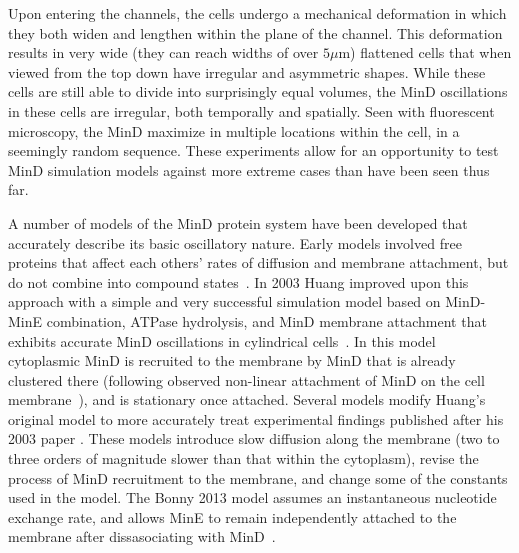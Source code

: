 \documentclass[letterpaper,twocolumn,amsmath,amssymb,pre]{revtex4-1}
\newcommand\micron{\ensuremath{\mu\text{m}}}
\begin{document}
Upon entering the channels, the cells undergo a mechanical deformation
in which they both widen and lengthen within the plane of the channel.
This deformation results in very wide (they can reach widths of over
$5\micron$) flattened cells that when viewed from the top down have
irregular and asymmetric shapes.  While these cells are still able to
divide into surprisingly equal volumes, the MinD oscillations in these
cells are irregular, both temporally and spatially. Seen with
fluorescent microscopy, the MinD maximize in multiple locations within
the cell, in a seemingly random sequence. These experiments allow for
an opportunity to test MinD simulation models against more extreme
cases than have been seen thus far.

A number of models of the MinD protein system have been developed that
accurately describe its basic oscillatory nature.
%
Early models involved free proteins that affect each others' rates of
diffusion and membrane attachment, but do not combine into compound
states~\cite{meinhardt2001pattern}.  In 2003 Huang improved upon this
approach with a simple and very successful simulation model based on
MinD-MinE combination, ATPase hydrolysis, and MinD membrane attachment
that exhibits accurate MinD oscillations in cylindrical
cells~\cite{huang2003dynamic}. In this model cytoplasmic MinD is
recruited to the membrane by MinD that is already clustered there
(following observed non-linear attachment of MinD on the cell
membrane~\cite{hu2002dynamic,shih2002division}), and is stationary
once attached.
%
Several models
\cite{fange2006noise,bonny2013membrane,halatek2012highly} modify
Huang's original model to more accurately treat experimental findings
published after his 2003 paper
\cite{meacci2006mobility,loose2011min}. These models introduce slow
diffusion along the membrane (two to three orders of magnitude slower
than that within the cytoplasm), revise the process of MinD
recruitment to the membrane, and change some of the constants used in
the model. The Bonny 2013 model assumes an instantaneous nucleotide
exchange rate, and allows MinE to remain independently attached to the
membrane after dissasociating with MinD~\cite{bonny2013membrane}.
%


\end{document}
